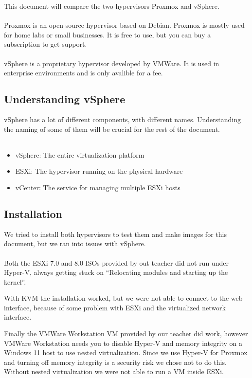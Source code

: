 This document will compare the two hypervisors Proxmox and vSphere.
\\\\
Proxmox is an open-source hypervisor based on Debian. Proxmox is mostly used for home labs or small businesses. It is free to use, but you can buy a subscription to get support.
\\\\
vSphere is a proprietary hypervisor developed by VMWare. It is used in enterprise environments and is only avalible for a fee.

\subsection{Understanding vSphere}

vSphere has a lot of different components, with different names. Understanding the naming of some of them will be crucial for the rest of the document.
\\\\
\begin{itemize}
	\item vSphere: The entire virtualization platform
	\item ESXi: The hypervisor running on the physical hardware
	\item vCenter: The service for managing multiple ESXi hosts
\end{itemize}

\subsection{Installation}

We tried to install both hypervisors to test them and make images for this document, but we ran into issues with vSphere.
\\\\
Both the ESXi 7.0 and 8.0 ISOs provided by out teacher did not run under Hyper-V, always getting stuck on ``Relocating modules and starting up the kernel''.

With KVM the installation worked, but we were not able to connect to the web interface, because of some problem with ESXi and the virtualized network interface.

Finally the VMWare Workstation VM provided by our teacher did work, however VMWare Workstation needs you to disable Hyper-V and memory integrity on a Windows 11 host to use nested virtualization. Since we use Hyper-V for Proxmox and turning off memory integrity is a security risk we chose not to do this. Without nested virtualization we were not able to run a VM inside ESXi.